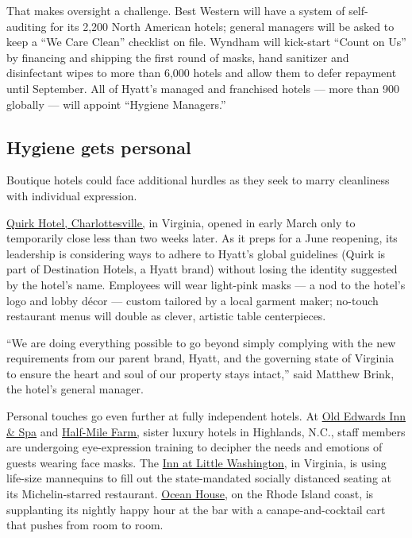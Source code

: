 That makes oversight a challenge. Best Western will have a system of
self-auditing for its 2,200 North American hotels; general managers will
be asked to keep a ``We Care Clean'' checklist on file. Wyndham will
kick-start ``Count on Us'' by financing and shipping the first round of
masks, hand sanitizer and disinfectant wipes to more than 6,000 hotels
and allow them to defer repayment until September. All of Hyatt's
managed and franchised hotels --- more than 900 globally --- will
appoint ``Hygiene Managers.''

\hypertarget{hygiene-gets-personal}{%
\subsection{Hygiene gets personal}\label{hygiene-gets-personal}}

Boutique hotels could face additional hurdles as they seek to marry
cleanliness with individual expression.

\href{https://www.destinationhotels.com/hotels-and-resorts/quirk-hotel-charlottesville}{Quirk
Hotel, Charlottesville,} in Virginia, opened in early March only to
temporarily close less than two weeks later. As it preps for a June
reopening, its leadership is considering ways to adhere to Hyatt's
global guidelines (Quirk is part of Destination Hotels, a Hyatt brand)
without losing the identity suggested by the hotel's name. Employees
will wear light-pink masks --- a nod to the hotel's logo and lobby décor
--- custom tailored by a local garment maker; no-touch restaurant menus
will double as clever, artistic table centerpieces.

``We are doing everything possible to go beyond simply complying with
the new requirements from our parent brand, Hyatt, and the governing
state of Virginia to ensure the heart and soul of our property stays
intact,'' said Matthew Brink, the hotel's general manager.

Personal touches go even further at fully independent hotels. At
\href{https://www.oldedwardshospitality.com/old-edwards-inn-spa}{Old
Edwards Inn \& Spa} and
\href{https://www.oldedwardshospitality.com/half-mile-farm}{Half-Mile
Farm,} sister luxury hotels in Highlands, N.C., staff members are
undergoing eye-expression training to decipher the needs and emotions of
guests wearing face masks. The
\href{https://theinnatlittlewashington.com/}{Inn at Little Washington,}
in Virginia, is using life-size mannequins to fill out the
state-mandated socially distanced seating at its Michelin-starred
restaurant. \href{https://www.oceanhouseri.com/}{Ocean House}, on the
Rhode Island coast, is supplanting its nightly happy hour at the bar
with a canape-and-cocktail cart that pushes from room to room.

